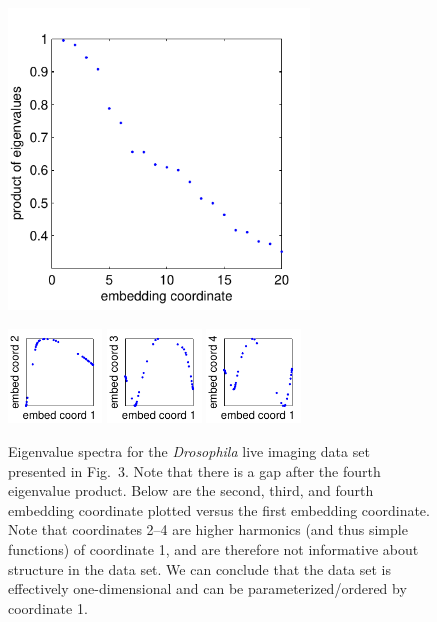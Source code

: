 \documentclass[10pt,twocolumn]{article}
\newcommand{\fig}[0]{Fig.}
\begin{document}
\begin{figure}
\includegraphics[width=8cm]{drosophila_live_eval_spectrum}

\includegraphics[width=2.5cm]{drosophila_live_evec_corr1}
\includegraphics[width=2.5cm]{drosophila_live_evec_corr2}
\includegraphics[width=2.5cm]{drosophila_live_evec_corr3}
\caption{Eigenvalue spectra for the {\em Drosophila} live imaging data set presented in \fig~3. Note that there is a gap after the fourth eigenvalue product. Below are the second, third, and fourth embedding coordinate plotted versus the first embedding coordinate. Note that coordinates 2--4 are higher harmonics (and thus simple functions) of coordinate 1, and are therefore not informative about structure in the data set.  We can conclude that the data set is effectively one-dimensional and can be parameterized/ordered by coordinate 1.}
\end{figure}
\end{document}
